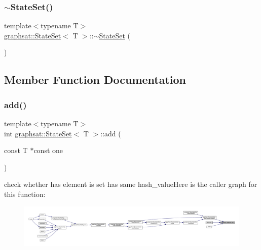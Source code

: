 \mbox{\label{classgraphsat_1_1_state_set_a80695c091bb5549583a09e7c71860a82}} 
\subsubsection{\texorpdfstring{$\sim$StateSet()}{~StateSet()}}
{\footnotesize\ttfamily template$<$typename T$>$ \\
\mbox{\hyperlink{classgraphsat_1_1_state_set}{graphsat\+::\+State\+Set}}$<$ T $>$\+::$\sim$\mbox{\hyperlink{classgraphsat_1_1_state_set}{State\+Set}} (\begin{DoxyParamCaption}{ }\end{DoxyParamCaption})\hspace{0.3cm}{\ttfamily [inline]}}



\subsection{Member Function Documentation}
\mbox{\label{classgraphsat_1_1_state_set_af6735cbd6b54fea6c2dbfdecdb70f49f}} 
\subsubsection{\texorpdfstring{add()}{add()}}
{\footnotesize\ttfamily template$<$typename T$>$ \\
int \mbox{\hyperlink{classgraphsat_1_1_state_set}{graphsat\+::\+State\+Set}}$<$ T $>$\+::add (\begin{DoxyParamCaption}\item[{const T $\ast$const}]{one }\end{DoxyParamCaption})\hspace{0.3cm}{\ttfamily [inline]}}

check whether has element is set has same hash\+\_\+valueHere is the caller graph for this function\+:
\nopagebreak
\begin{figure}[H]
\begin{center}
\leavevmode
\includegraphics[width=350pt]{classgraphsat_1_1_state_set_af6735cbd6b54fea6c2dbfdecdb70f49f_icgraph}
\end{center}
\end{figure}
\mbox{\label{classgraphsat_1_1_state_set_a2a7f602339d0ef9c428da2333a93199f}} 
